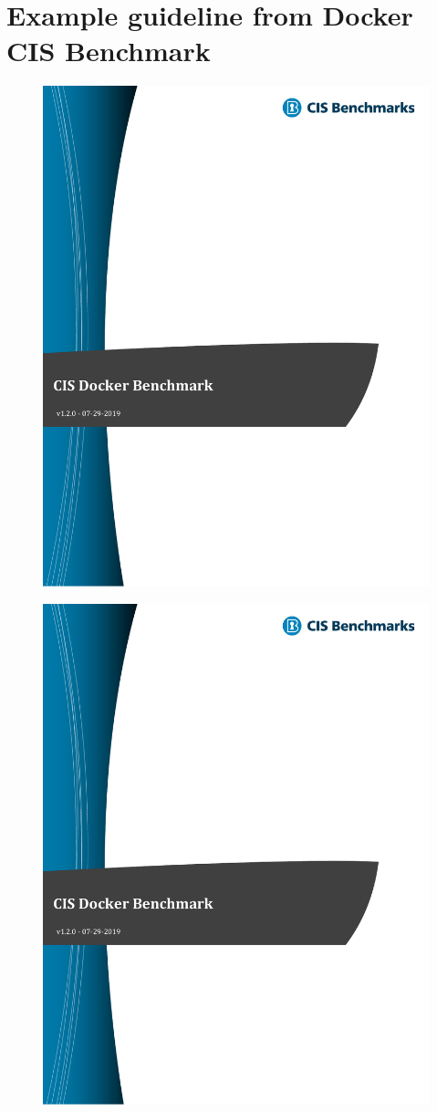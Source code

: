 \chapter{Example guideline from Docker CIS Benchmark}\label{appendix:CIS-Benchmark-Example}

\begin{figure}[ht]
    \centering
    \includegraphics[page=135,width=.8\textwidth]{resources/images/cis_docker_benchmarks.pdf}
\end{figure}

\pagebreak

\begin{figure}[ht]
    \centering
    \includegraphics[page=136,width=.8\textwidth]{resources/images/cis_docker_benchmarks.pdf}
\end{figure}

